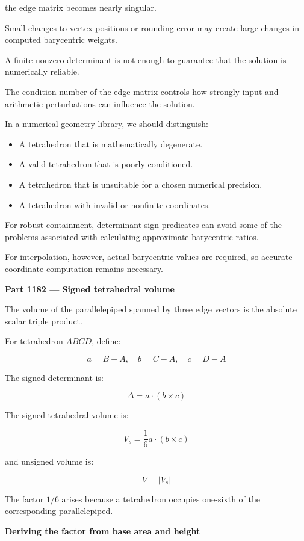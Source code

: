 the edge matrix becomes nearly singular.

Small changes to vertex positions or rounding error may create large changes in computed barycentric weights.

A finite nonzero determinant is not enough to guarantee that the solution is numerically reliable.

The condition number of the edge matrix controls how strongly input and arithmetic perturbations can influence the solution.

In a numerical geometry library, we should distinguish:

\begin{itemize}
\tightlist
\item
  A tetrahedron that is mathematically degenerate.
\item
  A valid tetrahedron that is poorly conditioned.
\item
  A tetrahedron that is unsuitable for a chosen numerical precision.
\item
  A tetrahedron with invalid or nonfinite coordinates.
\end{itemize}

For robust containment, determinant-sign predicates can avoid some of the problems associated with calculating approximate barycentric ratios.

For interpolation, however, actual barycentric values are required, so accurate coordinate computation remains necessary.

\textbf{Part 1182 --- Signed tetrahedral volume}

The volume of the parallelepiped spanned by three edge vectors is the absolute scalar triple product.

For tetrahedron \(ABCD\), define:

\[
a=B-A,\quad b=C-A,\quad c=D-A
\]

The signed determinant is:

\[
\boxed{ \Delta=a\cdot(b\times c) }
\]

The signed tetrahedral volume is:

\[
\boxed{ V_s=\frac16a\cdot(b\times c) }
\]

and unsigned volume is:

\[
\boxed{ V=|V_s| }
\]

The factor \(1/6\) arises because a tetrahedron occupies one-sixth of the corresponding parallelepiped.

\textbf{Deriving the factor from base area and height}

